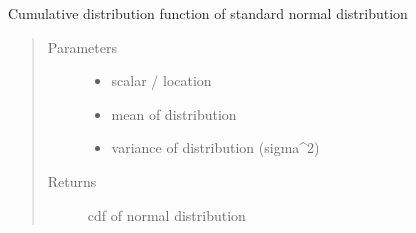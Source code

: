 \documentclass[letterpaper,12pt,english]{sphinxmanual}
\begin{document}
\begin{fulllineitems}
\label{\detokenize{PARyOpt:PARyOpt.utils.cdf_normal}}
\sphinxAtStartPar
Cumulative distribution function of standard normal distribution
\begin{quote}\begin{description}
\item[{Parameters}] \leavevmode\begin{itemize}
\item {} 
\sphinxAtStartPar
{} \textendash{} scalar / location

\item {} 
\sphinxAtStartPar
{} \textendash{} mean of distribution

\item {} 
\sphinxAtStartPar
{} \textendash{} variance of distribution (sigma\textasciicircum{}2)

\end{itemize}

\item[{Returns}] \leavevmode
\sphinxAtStartPar
cdf of normal distribution

\end{description}\end{quote}

\end{fulllineitems}

\end{document}

